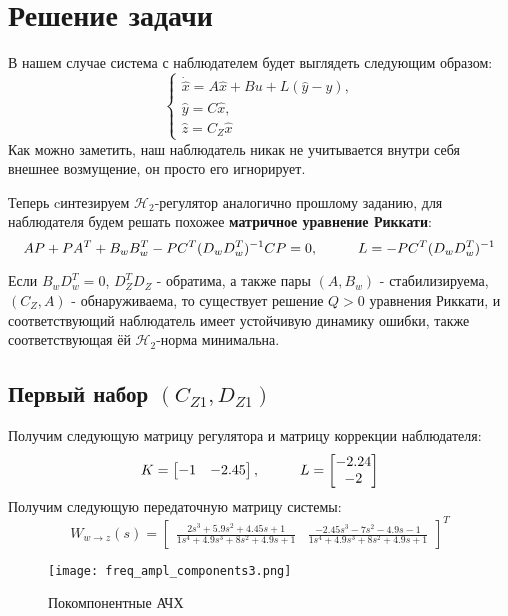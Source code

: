 \section{Решение задачи}

В нашем случае система с наблюдателем будет выглядеть следующим образом:
$$
    \begin{cases}
        \dot{\hat{x}} = A\hat{x} + Bu + L(\hat{y} - y), \\
        \hat{y} = C\hat{x}, \\
        \hat{z} = C_Z \hat{x}
    \end{cases}
$$
Как можно заметить, наш наблюдатель никак не учитывается внутри себя внешнее возмущение, он просто его игнорирует.

Теперь cинтезируем $\mathcal{H}_2$-регулятор аналогично прошлому заданию, для наблюдателя будем решать похожее \textbf{матричное уравнение Риккати}:
$$
    AP + PA^T + B_w B_w^T - P C^T (D_w D_w^T)^{-1} C P = 0, \hspace*{1cm} L = -PC^T(D_w D_w^T)^{-1}
$$

Если $B_w D_w^T = 0$, $D^T_Z D_Z$ - обратима, а также пары $(A, B_w)$ - стабилизируема, 
$(C_Z, A)$ - обнаруживаема, то существует решение $Q > 0$ уравнения Риккати, и соответствующий наблюдатель
имеет устойчивую динамику ошибки, также соответствующая ёй $\mathcal{H}_2$-норма минимальна.

\newpage
\subsection{Первый набор $(C_{Z1},D_{Z1})$}

Получим следующую матрицу регулятора и матрицу коррекции наблюдателя: 
$$
    K = \begin{bmatrix}
        -1 & -2.45 \\
    \end{bmatrix}, \hspace*{1cm} 
    L = \begin{bmatrix} -2.24 \\ -2 \\ \end{bmatrix}
$$
Получим следующую передаточную матрицу системы:
$$
    W_{w\rightarrow z}(s) = \begin{bmatrix}\frac{2s^{3} + 5.9s^{2} + 4.45s + 1}{1s^{4} + 4.9s^{3} + 8s^{2} + 4.9s + 1} & \frac{-2.45s^{3} - 7s^{2} - 4.9s - 1}{1s^{4} + 4.9s^{3} + 8s^{2} + 4.9s + 1} \end{bmatrix}^T
$$


\begin{figure}[ht]
    \centering
    \texttt{[image: freq\_ampl\_components3.png]}
    \caption{Покомпонентные АЧХ}
  \end{figure}

